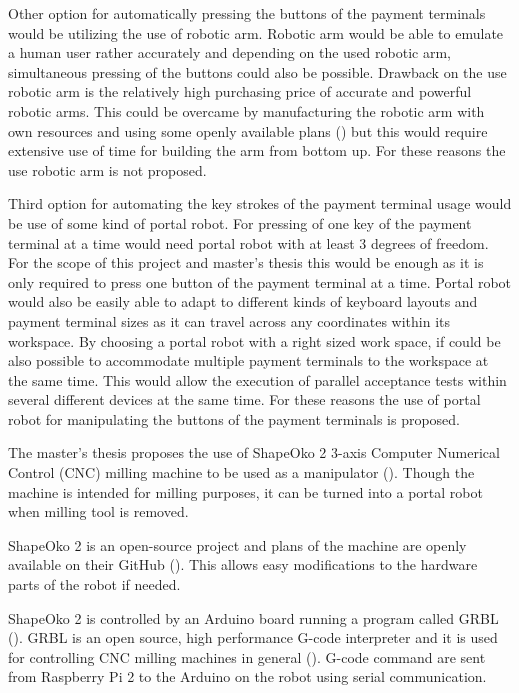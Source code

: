 Other option for automatically pressing the buttons of the payment terminals would be utilizing the use of robotic arm. Robotic arm would be able to emulate a human user rather accurately and depending on the used robotic arm, simultaneous pressing of the buttons could also be possible. Drawback on the use robotic arm is the relatively high purchasing price of accurate and powerful robotic arms. This could be overcame by manufacturing the robotic arm with own resources and using some openly available plans (\emph{\cite{bcn3d}}) but this would require extensive use of time for building the arm from bottom up. For these reasons the use robotic arm is not proposed.

Third option for automating the key strokes of the payment terminal usage would be use of some kind of portal robot. For pressing of one key of the payment terminal at a time would need portal robot with at least 3 degrees of freedom. For the scope of this project and master's thesis this would be enough as it is only required to press one button of the payment terminal at a time. Portal robot would also be easily able to adapt to different kinds of keyboard layouts and payment terminal sizes as it can travel across any coordinates within its workspace. By choosing a portal robot with a right sized work space, if could be also possible to accommodate multiple payment terminals to the workspace at the same time. This would allow the execution of parallel acceptance tests within several different devices at the same time. For these reasons the use of portal robot for manipulating the buttons of the payment terminals is proposed.

The master's thesis proposes the use of ShapeOko 2 3-axis Computer Numerical Control (CNC) milling machine to be used as a manipulator (\emph{\cite{shapeoko}}). Though the machine is intended for milling purposes, it can be turned into a portal robot when milling tool is removed.

ShapeOko 2 is an open-source project and plans of the machine are openly available on their GitHub (\emph{\cite{shapeoko_git}}). This allows easy modifications to the hardware parts of the robot if needed.

ShapeOko 2 is controlled by an Arduino board running a program called GRBL (\emph{\cite{grbl}}). GRBL is an open source, high performance G-code interpreter and it is used for controlling CNC milling machines in general (\emph{\cite{shapeoko}}). G-code command are sent from Raspberry Pi 2 to the Arduino on the robot using serial communication.

